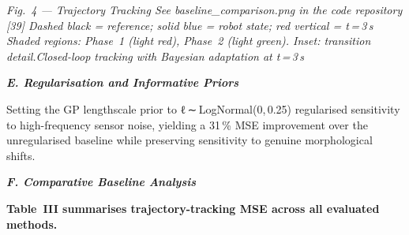 \documentclass[letterpaper, 10pt, journal, twoside]{IEEEtran}
\begin{document}
\emph{Fig.~4 --- Trajectory Tracking See baseline\_comparison.png in the
code repository {[}39{]} Dashed black = reference; solid blue = robot
state; red vertical = t\,=\,3\,s Shaded regions: Phase~1 (light red),
Phase~2 (light green). Inset: transition detail.Closed-loop tracking
with Bayesian adaptation at t\,=\,3\,s}

\emph{\textbf{E. Regularisation and Informative Priors}}

Setting the GP lengthscale prior to ℓ\,∼\,LogNormal(0,\,0.25)
regularised sensitivity to high-frequency sensor noise, yielding a
31\,\% MSE improvement over the unregularised baseline while preserving
sensitivity to genuine morphological shifts.

\emph{\textbf{F. Comparative Baseline Analysis}}

\textbf{Table~III summarises trajectory-tracking MSE across all
evaluated methods.}
\end{document}
